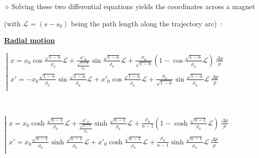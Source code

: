 \documentclass[12pt]{article}
\newcommand{\nid}{\noindent \ensuremath{\diamond~}}
\newcommand{\blue}{\color{blue}}
\begin{document}
{\fontsize{20}{28} \selectfont

\nid Solving these two differential equations yields  the coordinates across a magnet

  (with $\mathcal{L}=(s-s_0)$ being the path length along the trajectory arc)~: 


{\blue \bf \underline{Radial motion}}

\medskip
{}

$~ \left| 
\begin{array}{l} 
 x = x_0 \cos\frac{\textstyle{\sqrt{1-n}}}{\textstyle{\rho_0}} \mathcal{L} + \frac{\textstyle{x'_0}}{\textstyle{\frac{\textstyle{\sqrt{1-n}}}{\textstyle{\rho_0}}}}  \sin\frac{\textstyle{\sqrt{1-n}}}{\textstyle{\rho_0}}  \mathcal{L}  
 + \frac{\textstyle{\rho_0}}{\textstyle{\sqrt{1-n}}}(1 - \cos\frac{\textstyle{\sqrt{1-n}}}{\textstyle{\rho_0}} \mathcal{L} )
\ \frac{\textstyle{\Delta p}}{\textstyle{p}} \\
 x' = -x_0 \frac{\textstyle{\sqrt{1-n}}}{\textstyle{\rho_0}} \sin\frac{\textstyle{\sqrt{1-n}}}{\textstyle{\rho_0}}  \mathcal{L} + x'_0  \cos\frac{\textstyle{\sqrt{1-n}}}{\textstyle{\rho_0}}  \mathcal{L} 
 + \frac{\textstyle{\rho_0}}{\textstyle{\sqrt{1-n}}}\sin\frac{\textstyle{\sqrt{1-n}}}{\textstyle{\rho_0}} \mathcal{L} 
\ \frac{\textstyle{\Delta p}}{\textstyle{p}}\\
\end{array} \right.$

~


$ \left| 
\begin{array}{l} 
 x = x_0 \cosh\frac{\textstyle{\sqrt{n-1}}}{\textstyle{\rho_0}} \mathcal{L} + \frac{\textstyle{x'_0}}{\textstyle{\frac{\textstyle{\sqrt{n-1}}}{\textstyle{\rho_0}}}}  \sinh\frac{\textstyle{\sqrt{n-1}}}{\textstyle{\rho_0}}  \mathcal{L}  
 + \frac{\textstyle{\rho_0}}{\textstyle{n-1}}(1 - \cosh\frac{\textstyle{\sqrt{n-1}}}{\textstyle{\rho_0}} \mathcal{L} )
\ \frac{\textstyle{\Delta p}}{\textstyle{p}}\\
 x' = x_0 \frac{\textstyle{\sqrt{n-1}}}{\textstyle{\rho_0}} \sinh\frac{\textstyle{\sqrt{n-1}}}{\textstyle{\rho_0}}  \mathcal{L} + x'_0  \cosh\frac{\textstyle{\sqrt{n-1}}}{\textstyle{\rho_0}}  \mathcal{L} 
 + \frac{\textstyle{\rho_0}}{\textstyle{n-1}}\sinh\frac{\textstyle{\sqrt{n-1}}}{\textstyle{\rho_0}} \mathcal{L} 
\ \frac{\textstyle{\Delta p}}{\textstyle{p}}\\
\end{array} \right.$

}
\end{document}
